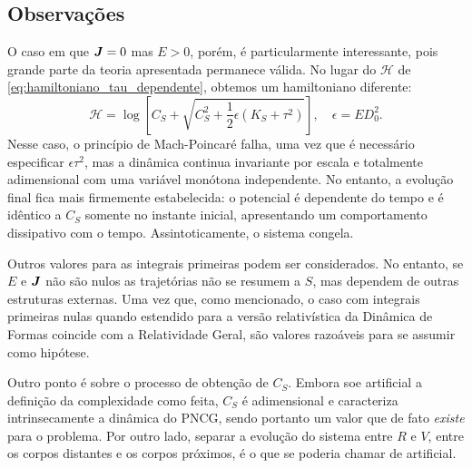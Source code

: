 \subsection{Observações}

O caso em que $\bm J = 0$ mas $E > 0$, porém, é particularmente interessante, pois grande parte da teoria apresentada permanece válida. No lugar do $\mathcal H$ de \ref{eq:hamiltoniano_tau_dependente}, obtemos um hamiltoniano diferente:
\begin{equation*}
    \mathcal H = \log{\left[ C_S + \sqrt{C_S^2 + \frac{1}{2} \epsilon (K_S + \tau ^2)} \right]},
    \quad
    \epsilon = E D_0^2.
\end{equation*}
Nesse caso, o princípio de Mach-Poincaré falha, uma vez que é necessário especificar $\epsilon \tau^2$, mas a dinâmica continua invariante por escala e totalmente adimensional com uma variável monótona independente. No entanto, a evolução final fica mais firmemente estabelecida: o potencial é dependente do tempo e é idêntico a $C_S$ somente no instante inicial, apresentando um comportamento dissipativo com o tempo. Assintoticamente, o sistema congela.

Outros valores para as integrais primeiras podem ser considerados. No entanto, se $E$ e $\bm J$ não são nulos as trajetórias não se resumem a $S$, mas dependem de outras estruturas externas. Uma vez que, como mencionado, o caso com integrais primeiras nulas quando estendido para a versão relativística da Dinâmica de Formas coincide com a Relatividade Geral, são valores razoáveis para se assumir como hipótese.

Outro ponto é sobre o processo de obtenção de $C_S$. Embora soe artificial a definição da complexidade como feita, $C_S$ é adimensional e caracteriza intrinsecamente a dinâmica do PNCG, sendo portanto um valor que de fato \textit{existe} para o problema. Por outro lado, separar a evolução do sistema entre $R$ e $V$, entre os corpos distantes e os corpos próximos, é o que se poderia chamar de artificial.


